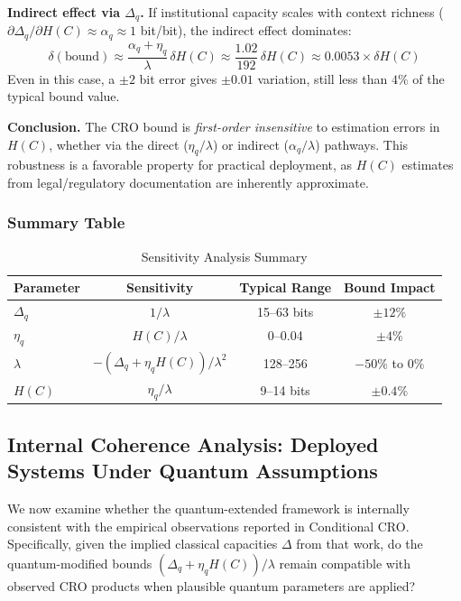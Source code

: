 \documentclass{ieeeaccess}
\begin{document}
\textbf{Indirect effect via $\Delta_q$.} 
If institutional capacity scales with context richness 
($\partial\Delta_q / \partial H(C) \approx \alpha_q \approx 1$ bit/bit), 
the indirect effect dominates:
\begin{equation}
    \delta(\text{bound}) \approx \frac{\alpha_q + \eta_q}{\lambda}
    \,\delta H(C) \approx \frac{1.02}{192}\, \delta H(C) 
    \approx 0.0053 \times \delta H(C)
\end{equation}
Even in this case, a $\pm 2$ bit error gives $\pm 0.01$ variation, 
still less than $4\%$ of the typical bound value.

\textbf{Conclusion.} The CRO bound is \emph{first-order insensitive} 
to estimation errors in $H(C)$, whether via the direct ($\eta_q/\lambda$) 
or indirect ($\alpha_q/\lambda$) pathways. This robustness is a 
favorable property for practical deployment, as $H(C)$ estimates 
from legal/regulatory documentation are inherently approximate.

\subsubsection{Summary Table}

\begin{table}[h]
\centering
\caption{Sensitivity Analysis Summary}
\label{tab:sensitivity}
\begin{tabular}{lccc}
\toprule
\textbf{Parameter} & \textbf{Sensitivity} & \textbf{Typical Range} & \textbf{Bound Impact} \\
\midrule
$\Delta_q$ & $1/\lambda$ & 15--63 bits & $\pm 12\%$ \\
$\eta_q$ & $H(C)/\lambda$ & 0--0.04 & $\pm 4\%$ \\
$\lambda$ & $-(\Delta_q + \eta_q H(C))/\lambda^2$ & 128--256 & $-50\%$ to $0\%$ \\
$H(C)$ & $\eta_q/\lambda$ & 9--14 bits & $\pm 0.4\%$ \\
\bottomrule
\end{tabular}
\end{table}

\subsection{Internal Coherence Analysis: Deployed Systems Under Quantum Assumptions}

We now examine whether the quantum-extended framework is internally consistent with the empirical observations reported in Conditional CRO. Specifically, given the implied classical capacities $\Delta$ from that work, do the quantum-modified bounds $(\Delta_q + \eta_q H(C))/\lambda$ remain compatible with observed CRO products when plausible quantum parameters are applied?
\end{document}
